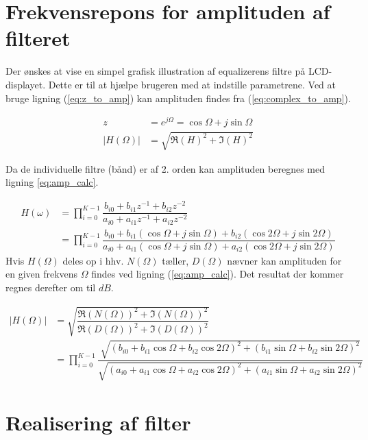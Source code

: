 \section{Frekvensrepons for amplituden af filteret }

Der ønskes at vise en simpel grafisk illustration af equalizerens filtre på LCD-displayet. 
Dette er til at hjælpe brugeren med at indstille parametrene.
Ved at bruge ligning (\ref{eq:z_to_amp}) kan amplituden findes fra (\ref{eq:complex_to_amp}).

\begin{align}
    z &= e^{j \Omega} = \cos{\Omega} + j \sin{\Omega}  
    \label{eq:z_to_amp}\\
    |H(\Omega)| &= \sqrt{ \Re{(H)}^2  + \Im{(H) }^2 }
    \label{eq:complex_to_amp}
\end{align}

Da de individuelle filtre (bånd) er af 2. orden kan amplituden beregnes med ligning \ref{eq:amp_calc}.

\begin{align}
    H(\omega) &= \prod\limits_{i=0}^{K-1} \dfrac{b_{i0} + b_{i1} z^{-1} + b_{i2} z^{-2}}{a_{i0} + a_{i1} z^{-1} + a_{i2} z^{-2}} \nonumber
    \\ &= \prod\limits_{i=0}^{K-1} \dfrac{b_{i0} + b_{i1} \left( \cos{\Omega} + j \sin{\Omega} \right)+b_{i2} \left( \cos{2\Omega} + j \sin{2\Omega} \right)}{a_{i0} + a_{i1} \left( \cos{\Omega} + j \sin{\Omega} \right)+a_{i2} \left( \cos{2\Omega} + j \sin{2\Omega} \right)} \label{eq:amp_rep}
\end{align}
Hvis $H(\Omega)$ deles op i hhv. $N(\Omega)$ tæller, $D(\Omega)$ nævner kan amplituden for en 
given frekvens $\Omega$ findes ved ligning (\ref{eq:amp_calc}).
Det resultat der kommer regnes derefter om til $dB$.

\begin{align}
    |H(\Omega)| &= \sqrt{ \dfrac{\Re{(N(\Omega))}^2 + \Im{(N(\Omega))}^2 }{\Re{(D(\Omega))}^2 + \Im{(D(\Omega))}^2 }} \nonumber	\\ 
     &= \prod\limits_{i=0}^{K-1} \dfrac{ \sqrt{\left( b_{i0} + b_{i1} \cos{\Omega} + b_{i2} \cos{2 \Omega} \right)^2 +  \left( b_{i1} \sin{\Omega} + b_{i2} \sin{2 \Omega} \right)^2 } }{ \sqrt{\left( a_{i0} + a_{i1} \cos{\Omega} + a_{i2} \cos{2 \Omega} \right)^2 + \left( a_{i1} \sin{\Omega} + a_{i2} \sin{2 \Omega} \right)^2} }
    \label{eq:amp_calc}
\end{align}


\section{Realisering af filter}


